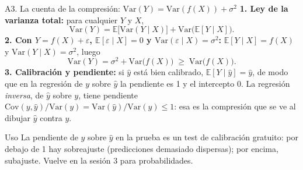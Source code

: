 \documentclass{beamer}
\newcommand{\E}{\mathbb{E}}
\newcommand{\Var}{\mathrm{Var}}
\newcommand{\Cov}{\mathrm{Cov}}
\newcommand{\1}{\mathbb{I}}
\begin{document}
\begin{frame}{A3. La cuenta de la compresión: $\Var(Y) = \Var(f(X)) + \sigma^2$}
\small
\textbf{1. Ley de la varianza total:} para cualquier $Y$ y $X$,
\[ \Var(Y) = \E\big[\Var(Y \mid X)\big] + \Var\big(\E[Y \mid X]\big). \]
\pause
\textbf{2. Con $Y = f(X) + \varepsilon$, $\E[\varepsilon \mid X] = 0$ y $\Var(\varepsilon \mid X) = \sigma^2$:} $\E[Y \mid X] = f(X)$ y $\Var(Y \mid X) = \sigma^2$, luego
\[ \Var(Y) = \sigma^2 + \Var\big(f(X)\big) \;\geq\; \Var\big(f(X)\big). \]
\pause
\textbf{3. Calibración y pendiente:} si $\hat{y}$ está bien calibrado, $\E[Y \mid \hat{y}] = \hat{y}$, de modo que en la regresión de $y$ sobre $\hat{y}$ la pendiente es 1 y el intercepto 0. La regresión \emph{inversa}, de $\hat{y}$ sobre $y$, tiene pendiente $\Cov(y, \hat{y})/\Var(y) = \Var(\hat{y})/\Var(y) \leq 1$: esa es la compresión que se ve al dibujar $\hat{y}$ contra $y$.
\pause
\vspace{0.1cm}
\begin{block}{Uso}
La pendiente de $y$ sobre $\hat{y}$ en la prueba es un test de calibración gratuito: por debajo de 1 hay sobreajuste (predicciones demasiado dispersas); por encima, subajuste. Vuelve en la sesión 3 para probabilidades.
\end{block}
\end{frame}

\end{document}
